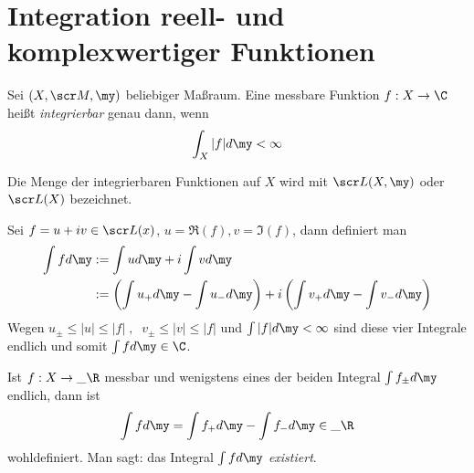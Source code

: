 \documentclass{mycourse}
\begin{document}
\section{Integration reell- und komplexwertiger Funktionen}

\begin{df*}
	Sei $(X,\scr M, \my)$ beliebiger Maßraum.
	Eine messbare Funktion $f:X\to \C$ heißt \emph{integrierbar} genau dann, wenn
	\[
		\int_X |f| d\my < \infty
	\]

	Die Menge der integrierbaren Funktionen auf $X$ wird mit $\scr L(X,\my)$ oder $\scr L(X)$ bezeichnet.

	Sei $f=u +iv \in \scr L(x)$, $u = \Re(f), v=\Im(f)$, dann definiert man
	\begin{align*}
		\int fd\my &:= \int ud\my + i\int vd\my\\
		&:= \left(\int u_+d\my - \int u_- d\my\right) + i\left(\int v_+ d\my - \int v_- d\my\right)
	\end{align*}
	Wegen $u_\pm \le |u| \le |f| \;,\;\; v_\pm \le |v| \le |f|$ und $\int |f|d\my < \infty$ sind diese vier Integrale endlich und somit $\int fd\my \in \C$.
	
	Ist $f:X\to \_\R$ messbar und wenigstens eines der beiden Integral $\int f_\pm d\my$ endlich, dann ist
	\[
		\int fd\my = \int f_+ d\my - \int f_- d\my \in \_\R
	\]
	wohldefiniert.
	Man sagt: das Integral $\int fd\my$ \emph{existiert}.
\end{df*}
\end{document}
